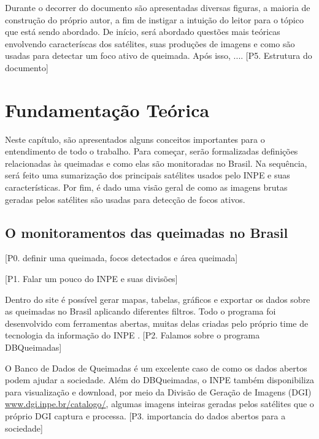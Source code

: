 \documentclass[cic,tc]{iiufrgs}
\begin{document}
Durante o decorrer do documento são apresentadas diversas figuras, a maioria de 
construção do próprio autor, a fim de instigar a intuição do leitor para o 
tópico que está sendo abordado. De início, será abordado questões mais teóricas 
envolvendo caracteríscas dos satélites, suas produções de imagens e como são 
usadas para detectar um foco ativo de queimada. Após isso, .... 
[P5. Estrutura do documento] \par



\chapter{Fundamentação Teórica}

Neste capítulo, são apresentados alguns conceitos importantes para o entendimento 
de todo o trabalho. Para começar, serão formalizadas definições relacionadas às 
queimadas e como elas são monitoradas no Brasil. Na sequência, será feito uma 
sumarização dos principais satélites usados 
pelo INPE e suas características. Por fim, é dado uma visão geral de como as 
imagens brutas geradas pelos satélites são usadas para detecção de focos ativos.\par

\section{O monitoramentos das queimadas no Brasil}

[P0. definir uma queimada, focos detectados e área queimada] \par

[P1. Falar um pouco do INPE e suas divisões] \par

Dentro do site é possível gerar mapas,
tabelas, gráficos e exportar os dados sobre as queimadas no Brasil 
aplicando diferentes filtros. Todo o programa foi desenvolvido com 
ferramentas abertas, muitas delas criadas pelo próprio time de tecnologia da 
informação do INPE \citep{setzer2019banco}. 
[P2. Falamos sobre o programa DBQueimadas] \par

O Banco de Dados de Queimadas é um excelente caso de como os dados abertos podem 
ajudar a sociedade. Além do DBQueimadas, o INPE também 
disponibiliza para visualização e download, por meio da Divisão de Geração de 
Imagens (DGI) \url{www.dgi.inpe.br/catalogo/}, algumas imagens inteiras geradas 
pelos satélites que o próprio DGI captura e processa. 
[P3. importancia do dados abertos para a sociedade] \par
\end{document}
